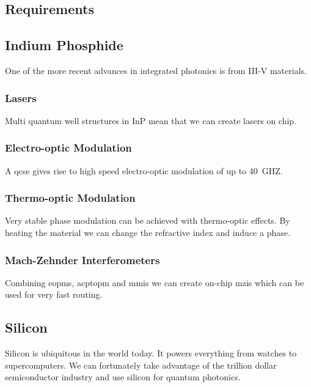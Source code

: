 \subsection{Requirements}

\subsection{Indium Phosphide}

One of the more recent advances in integrated photonics is from III-V materials.

\subsubsection*{Lasers}

Multi quantum well structures in \ac{InP} mean that we can create lasers on chip.

\subsubsection*{Electro-optic Modulation}

A \ac{qcse} gives rise to high speed electro-optic modulation of up to \SI{40}{GHZ}.

\subsubsection*{Thermo-optic Modulation}

Very stable phase modulation can be achieved with thermo-optic effects. By heating the material we can change the refractive index and induce a phase.

\subsubsection*{Mach-Zehnder Interferometers}

Combining \acp{eopm}, acp{topm} and \acp{mmi} we can create on-chip \acp{mzi} which can be used for very fast routing. 

\subsection{Silicon}

Silicon is ubiquitous in the world today. It powers everything from watches to supercomputers. We can fortunately take advantage of the trillion dollar semiconductor industry and use silicon for quantum photonics.

